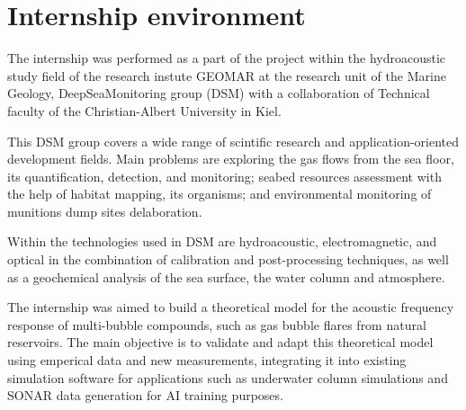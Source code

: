 


\section{Internship environment}
The internship was performed as a part of the project within the hydroacoustic study field of the research instute GEOMAR at the research unit of the Marine Geology, DeepSeaMonitoring group (DSM) with a collaboration of Technical faculty of the Christian-Albert University in Kiel. 

This DSM group covers a wide range of scintific research and application-oriented development fields. Main problems are exploring the gas flows from the sea floor, its quantification, detection, and monitoring; seabed resources assessment with the help of habitat mapping, its organisms; and environmental monitoring of munitions dump sites delaboration\cite{noauthor_deepsea_nodate}.

Within the technologies used in DSM are hydroacoustic, electromagnetic, and optical in the combination of calibration and post-processing techniques, as well as a geochemical analysis of the sea surface, the water column and atmosphere.

The internship was aimed to build a theoretical model for the acoustic frequency response of multi-bubble compounds, such as gas bubble flares from natural reservoirs. The main objective is to validate and adapt this theoretical model using emperical data and new measurements, integrating it into existing simulation software for applications such as underwater column simulations and SONAR data generation for AI training purposes.



